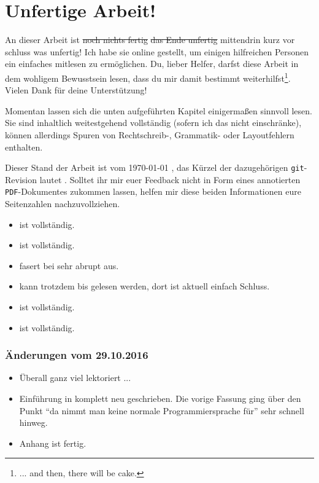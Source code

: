 \documentclass[paper=a4,fontsize=12pt,parskip=half,twoside]{scrartcl}
\title{\doctitle}
\subtitle{\docsubtitle}
\author{\docauthors}
\date{\today{}}
\begin{document}


\newpage

\section*{Unfertige Arbeit!}

An dieser Arbeit ist \sout{noch nichts fertig} \sout{das Ende unfertig} mittendrin kurz vor schluss was unfertig! Ich habe sie online gestellt, um einigen hilfreichen Personen ein einfaches mitlesen zu ermöglichen. Du, lieber Helfer, darfst diese Arbeit in dem wohligem Bewusstsein lesen, dass du mir damit bestimmt weiterhilfst\footnote{... and then, there will be cake.}. Vielen Dank für deine Unterstützung!

Momentan lassen sich die unten aufgeführten Kapitel einigermaßen sinnvoll lesen. Sie sind inhaltlich weitestgehend vollständig (sofern ich das nicht einschränke), können allerdings Spuren von Rechtschreib-, Grammatik- oder Layoutfehlern enthalten.

Dieser Stand der Arbeit ist vom \today{} \currenttime{}, das Kürzel der dazugehörigen \texttt{git}-Revision lautet \texttt{}. Solltet ihr mir euer Feedback nicht in Form eines annotierten \texttt{PDF}-Dokumentes zukommen lassen, helfen mir diese beiden Informationen eure Seitenzahlen nachzuvollziehen.

\begin{itemize}[noitemsep]
\item {} ist vollständig.
\item {} ist vollständig.
\item {} fasert bei  sehr abrupt aus.
\item {} kann trotzdem bis  gelesen werden, dort ist aktuell einfach Schluss.
\item {} ist vollständig.
\item {} ist vollständig.
\end{itemize}

\subsubsection*{Änderungen vom 29.10.2016}
\begin{itemize}[noitemsep]
\item Überall ganz viel lektoriert ...
\item Einführung in  komplett neu geschrieben. Die vorige Fassung ging über den Punkt "`da nimmt man keine normale Programmiersprache für"' sehr schnell hinweg.
\item Anhang  ist fertig.
\end{itemize}
\end{document}
